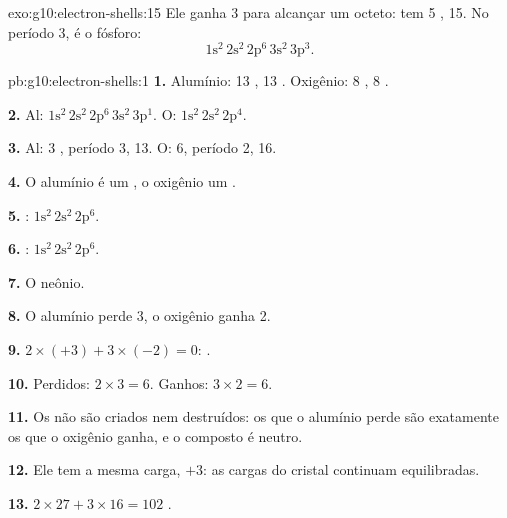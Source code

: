 \begin{solution}{exo:g10:electron-shells:15}
Ele ganha 3  para alcançar um octeto: tem 5 ,  15. No período 3, é o fósforo:
\[ 1\mathrm{s}^2\,2\mathrm{s}^2\,2\mathrm{p}^6\,3\mathrm{s}^2\,3\mathrm{p}^3. \]
\end{solution}

\begin{solution}{pb:g10:electron-shells:1}
\textbf{1.} Alumínio: 13 , 13 . Oxigênio: 8 , 8
.

\textbf{2.} Al: $1\mathrm{s}^2\,2\mathrm{s}^2\,2\mathrm{p}^6\,3\mathrm{s}^2\,3\mathrm{p}^1$.
O: $1\mathrm{s}^2\,2\mathrm{s}^2\,2\mathrm{p}^4$.

\textbf{3.} Al: 3 , período 3,  13. O: 6,
período 2,  16.

\textbf{4.} O alumínio é um , o oxigênio um .

\textbf{5.} : $1\mathrm{s}^2\,2\mathrm{s}^2\,2\mathrm{p}^6$.

\textbf{6.} : $1\mathrm{s}^2\,2\mathrm{s}^2\,2\mathrm{p}^6$.

\textbf{7.} O neônio.

\textbf{8.} O alumínio perde 3, o oxigênio ganha 2.

\textbf{9.} $2 \times (+3) + 3 \times (-2) = 0$: .

\textbf{10.} Perdidos: $2 \times 3 = 6$. Ganhos: $3 \times 2 = 6$.

\textbf{11.} Os  não são criados nem destruídos: os que o
alumínio perde são exatamente os que o oxigênio ganha, e o composto é
neutro.

\textbf{12.} Ele tem a mesma carga, $+3$: as cargas do cristal continuam
equilibradas.

\textbf{13.} $2 \times 27 + 3 \times 16 = 102$ .


\end{solution}
